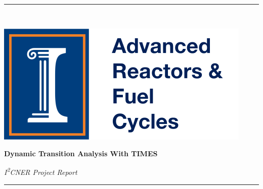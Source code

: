 \documentclass[14pt,a4paper]{article} %
\begin{document}

\begin{titlepage} %
    \newcommand{\HRule}{\rule{\linewidth}{0.5mm}} %
    
    \center %

    
    \HRule\\[0.2cm]
    
     \begin{minipage}{0.4\textwidth}
        \includegraphics[width=\textwidth]{arfc-logo}
        \end{minipage}%
        \begin{minipage}{0.6\textwidth}
        {\begin{flushright}\huge\bfseries Dynamic Transition Analysis With TIMES\end{flushright}}
        {\begin{flushright}\large\textit{I\textsuperscript{2}CNER Project Report}\end{flushright}}

        \end{minipage}

    \vspace{0.2cm}
    \HRule
    \vspace{0.5cm}
    
    

\end{titlepage}
\end{document}
